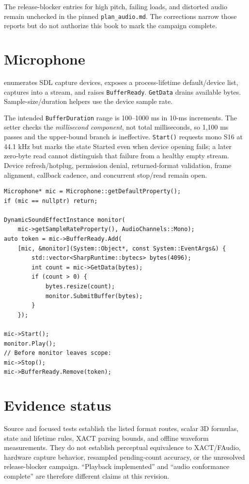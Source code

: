 The release-blocker entries for high pitch, failing loads, and distorted audio remain unchecked
in the pinned \texttt{plan\_audio.md}. The corrections narrow those reports but do not authorize
this book to mark the campaign complete.

\section{Microphone}

 enumerates SDL capture devices, exposes a process-lifetime default/device
list, captures into a stream, and raises \texttt{BufferReady}. \texttt{GetData} drains available
bytes. Sample-size/duration helpers use the device sample rate.

The intended \texttt{BufferDuration} range is 100--1000 ms in 10-ms increments. The setter
checks the \emph{millisecond component}, not total milliseconds, so 1,100 ms passes and the
upper-bound branch is ineffective. \texttt{Start()} requests mono S16 at 44.1 kHz but marks the
state Started even when device opening fails; a later zero-byte read cannot distinguish that
failure from a healthy empty stream. Device refresh/hotplug, permission denial, returned-format
validation, frame alignment, callback cadence, and concurrent stop/read remain open.

\begin{lstlisting}
Microphone* mic = Microphone::getDefaultProperty();
if (mic == nullptr) return;

DynamicSoundEffectInstance monitor(
    mic->getSampleRateProperty(), AudioChannels::Mono);
auto token = mic->BufferReady.Add(
    [mic, &monitor](System::Object*, const System::EventArgs&) {
        std::vector<SharpRuntime::bytecs> bytes(4096);
        int count = mic->GetData(bytes);
        if (count > 0) {
            bytes.resize(count);
            monitor.SubmitBuffer(bytes);
        }
    });

mic->Start();
monitor.Play();
// Before monitor leaves scope:
mic->Stop();
mic->BufferReady.Remove(token);
\end{lstlisting}

\section{Evidence status}

Source and focused tests establish the listed format routes, scalar 3D formulas, state and
lifetime rules, XACT parsing bounds, and offline waveform measurements. They do not establish
perceptual equivalence to XACT/FAudio, hardware capture behavior, resampled pending-count
accuracy, or the unresolved release-blocker campaign. ``Playback implemented'' and ``audio
conformance complete'' are therefore different claims at this revision.
